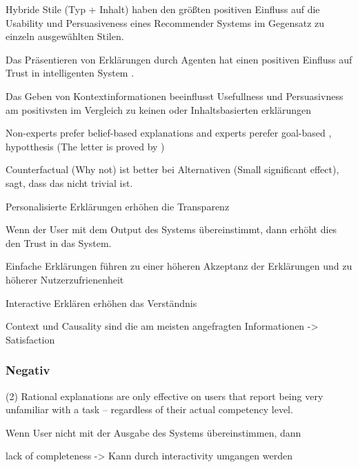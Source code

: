 Hybride Stile (Typ + Inhalt) haben den größten positiven Einfluss auf die Usability und Persuasiveness eines Recommender Systems im Gegensatz zu einzeln ausgewählten Stilen. \cite{sato_action-triggering_2019, kunkel_let_2019, sato_action-triggering_2019, schrills_color_2020, lim_2009_assessing}

Das Präsentieren von Erklärungen durch Agenten hat einen positiven Einfluss auf Trust in intelligenten System \cite{weitz_you_2019}.

Das Geben von Kontextinformationen beeinflusst Usefullness und Persuasivness am positivsten im Vergleich zu keinen oder Inhaltsbasierten erklärungen \cite{sato_action-triggering_2019}

Non-experts prefer belief-based explanations and experts perefer goal-based \cite{kaptein_personalised_2017}, hypotthesis (The letter is proved by \cite{martin_evaluating_2021})

Counterfactual (Why not) ist better bei Alternativen \cite{martin_evaluating_2021, schrills_color_2020}  \cite{neerincx_using_2018} \cite{schrills_color_2020} (Small significant effect), \cite{lim_2009_assessing} sagt, dass das nicht trivial ist.

Personalisierte Erklärungen erhöhen die Transparenz \cite{sokol_one_2020, wiegand2019drive}

Wenn der User mit dem Output des Systems übereinstimmt, dann erhöht dies den Trust in das System. \cite{schrills_color_2020}

Einfache Erklärungen führen zu einer höheren Akzeptanz der Erklärungen und zu höherer Nutzerzufrienenheit \cite{hleg2019policy, sovrano_modelling_2020}

Interactive Erklären erhöhen das Verständnis \cite{cheng2019explaining}

Context und Causality sind die am meisten angefragten Informationen \cite{chazette_end-users_nodate} -> Satisfaction


\subsubsection*{Negativ}

(2) Rational explanations are only effective on users that report being very unfamiliar with a task – regardless of their actual competency level. \cite{schaffer_i_2019}

Wenn User nicht mit der Ausgabe des Systems übereinstimmen, dann 

lack of completeness \cite{chazette_end-users_nodate} -> Kann durch interactivity umgangen werden

